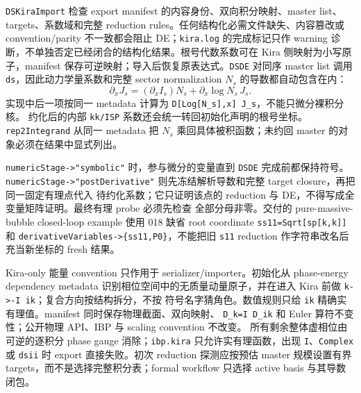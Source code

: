 ﻿\documentclass[a4paper,11pt]{article}
\begin{document}
\texttt{DSKiraImport} 检查 export manifest 的内容身份、双向积分映射、master list、targets、系数域和完整 reduction rules。任何结构化必需文件缺失、内容篡改或 convention/parity 不一致都会阻止 DE；\texttt{kira.log} 的完成标记只作 warning 诊断，不单独否定已经闭合的结构化结果。根号代数系数可在 Kira 侧映射为小写原子，manifest 保存可逆映射；导入后恢复原表达式。\texttt{DSDE} 对同序 master list 调用 \texttt{ds}，因此动力学量系数和完整 sector normalization $N_s$ 的导数都自动包含在内：
\begin{equation}
 \partial_x J_s=\left(\partial_x I_s\right)N_s+\partial_x\log N_s\,J_s.
\end{equation}
实现中后一项按同一 metadata 计算为 \texttt{D[Log[N\_s],x] J\_s}，不能只微分裸积分核。
约化后的内部 \texttt{kk/ISP} 系数还会统一转回初始化声明的根号坐标。\texttt{rep2Integrand} 从同一 metadata 把 $N_s$ 乘回具体被积函数；未约回 master 的对象必须在结果中显式列出。

\texttt{numericStage->"symbolic"} 时，参与微分的变量直到 \texttt{DSDE} 完成前都保持符号。
\texttt{numericStage->"postDerivative"} 则先冻结解析导数和完整 target closure，再把同一固定有理点代入
待约化系数；它只证明该点的 reduction 与 DE，不得写成全变量矩阵证明。最终有理 probe 必须先检查
全部分母非零。交付的 pure-massive-bubble closed-loop example 使用 018 缺省 root coordinate
\texttt{ss11=Sqrt[sp[k,k]]} 和 \texttt{derivativeVariables->\{ss11,P0\}}，不能把旧 \texttt{s11}
reduction 作字符串改名后充当新坐标的 fresh 结果。

Kira-only 能量 convention 只作用于 serializer/importer。初始化从 phase-energy dependency metadata
识别相位空间中的无质量动量原子，并在进入 Kira 前做 \texttt{k->-I ik}；复合方向按结构拆分，不按
符号名字猜角色。数值规则只给 \texttt{ik} 精确实有理值。manifest 同时保存物理截面、双向映射、
\texttt{D\_k=I D\_ik} 和 Euler 算符不变性；公开物理 API、IBP 与 scaling convention 不改变。
所有剩余整体虚相位由可逆的逐积分 phase gauge 消除；\texttt{ibp.kira} 只允许实有理函数，出现
\texttt{I}、\texttt{Complex} 或 \texttt{dsii} 时 export 直接失败。初次 reduction 探测应按预估 master
规模设置有界 targets，而不是选择完整积分表；formal workflow 只选择 active basis 与其导数闭包。
\end{document}
